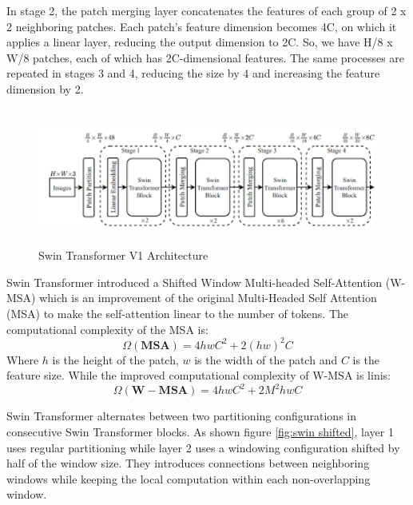 In stage 2, the patch merging layer concatenates the features of each group of 2 x 2 neighboring patches. Each patch’s feature dimension becomes 4C, on which it applies a linear layer, reducing the output dimension to 2C. So, we have H/8 x W/8 patches, each of which has 2C-dimensional features. The same processes are repeated in stages 3 and 4, reducing the size by 4 and increasing the feature dimension by 2.

\FloatBarrier
\begin{figure}[ht]
\centering
\includegraphics[width=11.5cm, height=4.5cm]{images/swin-transformer-4block.png}
\caption{Swin Transformer V1 Architecture \protect\cite{swin-v1}}
\label{fig:swin architecture1}
\end{figure}

Swin Transformer introduced a Shifted Window Multi-headed Self-Attention (W-MSA) which is an improvement of the original Multi-Headed Self Attention (MSA) to make the self-attention linear to the number of tokens. The computational complexity of the MSA is:
\begin{equation}
    \Omega (\mathbf{MSA}) = 4hwC^2 + 2(hw)^2C
\end{equation}
Where $h$ is the height of the patch, $w$ is the width of the patch and $C$ is the feature size. While the improved computational complexity of W-MSA is linis:
\begin{equation}
    \Omega (\mathbf{W-MSA}) = 4hwC^2 + 2M^2hwC
\end{equation}

Swin Transformer alternates between two partitioning configurations in consecutive Swin Transformer blocks. As shown figure \ref{fig:swin shifted}, layer 1 uses regular partitioning while layer 2 uses a windowing configuration shifted by half of the window size. They introduces connections between neighboring windows while keeping the local computation within each non-overlapping window.

